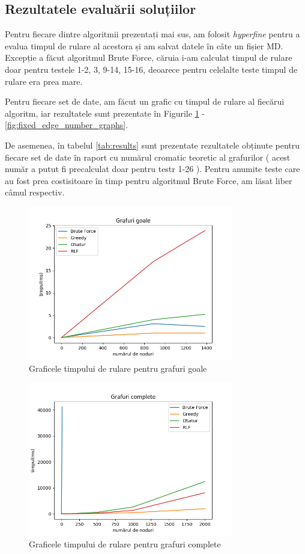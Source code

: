 \documentclass[runningheads]{llncs}
\begin{document}
\subsection{Rezultatele evaluării soluțiilor}
Pentru fiecare dintre algoritmii prezentați mai sus, am folosit \textit{hyperfine}
pentru a evalua timpul de rulare al acestora și am salvat datele în câte un fișier
MD. Excepție a făcut algoritmul Brute Force, căruia i-am calculat timpul de rulare
doar pentru testele 1-2, 3, 9-14, 15-16, deoarece pentru celelalte teste timpul de
rulare era prea mare.

Pentru fiecare set de date, am făcut un grafic cu timpul de rulare al fiecărui
algoritm, iar rezultatele sunt prezentate în Figurile \ref{fig:empty_graphs} - \ref{fig:fixed_edge_number_graphs}.

De asemenea, în tabelul \ref{tab:results} sunt prezentate rezultatele obținute
pentru fiecare set de date în raport cu numărul cromatic teoretic al grafurilor (
    acest număr a putut fi precalculat doar pentru testr 1-26
).
Pentru anumite teste care au fost prea costisitoare în timp pentru algoritmul Brute Force, am
lăsat liber câmul respectiv.
\pagebreak

\begin{figure}[!]
\centering
\includegraphics[width=0.8\textwidth]{./graphics/fig1.png}
\caption{Graficele timpului de rulare pentru grafuri goale}
\label{fig:empty_graphs}
\end{figure}

\begin{figure}[!]
\centering
\includegraphics[width=0.8\textwidth]{./graphics/fig2.png}
\caption{Graficele timpului de rulare pentru grafuri complete}
\label{fig:complete_graphs}
\end{figure}
\end{document}
